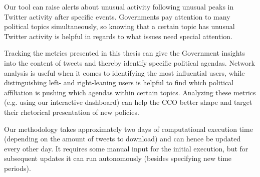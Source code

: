         Our tool can raise alerts about unusual activity following unusual peaks in Twitter activity after specific events. Governments pay attention to many political topics simultaneously, so knowing that a certain topic has unusual Twitter activity is helpful in regards to what issues need special attention. 
        
        Tracking the metrics presented in this thesis can give the Government insights into the content of tweets and thereby identify specific political agendas. Network analysis is useful when it comes to identifying the most influential users, while distinguishing left- and right-leaning users is helpful to find which political affiliation is pushing which agendas within certain topics. Analyzing these metrics (e.g. using our interactive dashboard) can help the CCO better shape and target their rhetorical presentation of new policies. 
        
        Our methodology takes approximately two days of computational execution time (depending on the amount of tweets to download) and can hence be updated %
        every other day. It requires some manual input for the initial execution, but for subsequent updates it can run autonomously (besides specifying new time periods).
    
    
    
    
    
    
